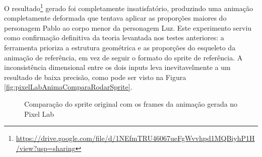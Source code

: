 O resultado\footnote{\url{https://drive.google.com/file/d/1NEfmTRU46067ueFgWvvhpd1MQBiyhP1H/view?usp=sharing}} gerado foi completamente insatisfatório, produzindo uma animação completamente deformada que tentava aplicar as proporções maiores do personagem Pablo ao corpo menor da personagem Luz. Este experimento serviu como confirmação definitiva da teoria levantada nos testes anteriores: a ferramenta prioriza a estrutura geométrica e as proporções do esqueleto da animação de referência, em vez de seguir o formato do sprite de referência. A inconsistência dimensional entre os dois inputs leva inevitavelmente a um resultado de baixa precisão, como pode ser visto na Figura \ref{fig:pixelLabAnimaComparaRodarSprite}.

\begin{figure}[htbp]
    \centering
    \caption{\small Comparação do sprite original com os frames da animação gerada no Pixel Lab}
    \label{fig:pixelLabAnimaComparaRodar}


\end{figure}

